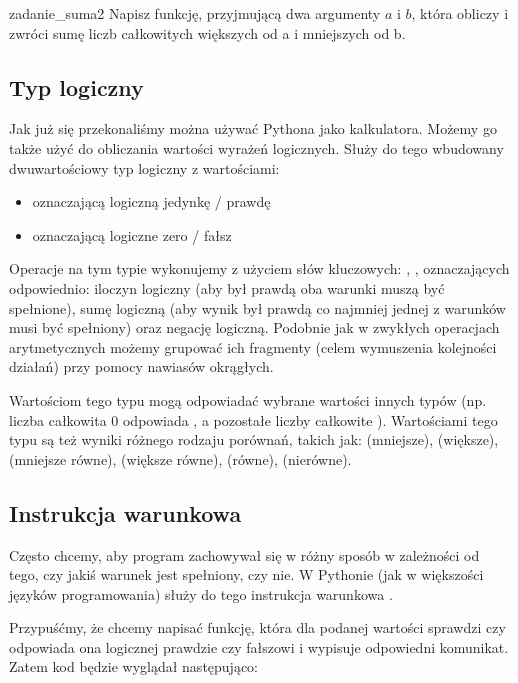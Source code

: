 \documentclass{pdfBooklets}
\begin{document}
\begin{Zadanie}{}{zadanie_suma2}
Napisz funkcję, przyjmującą dwa argumenty $a$ i $b$, która obliczy i zwróci sumę liczb całkowitych większych od a i mniejszych od b.
\end{Zadanie}

\subsection{Typ logiczny}

Jak już się przekonaliśmy można używać Pythona jako kalkulatora. Możemy go także użyć do obliczania wartości wyrażeń logicznych. Służy do tego wbudowany dwuwartościowy typ logiczny z wartościami:
\begin{itemize}
\item {} oznaczającą logiczną jedynkę / prawdę
\item {} oznaczającą logiczne zero / fałsz
\end{itemize}
Operacje na tym typie wykonujemy z użyciem słów kluczowych: , ,  oznaczających odpowiednio:
iloczyn logiczny (aby był prawdą oba warunki muszą być spełnione), sumę logiczną (aby wynik był prawdą co najmniej jednej z warunków musi być spełniony) oraz negację logiczną.
Podobnie jak w zwykłych operacjach arytmetycznych możemy grupować ich fragmenty (celem wymuszenia kolejności działań) przy pomocy nawiasów okrągłych.

Wartościom tego typu mogą odpowiadać wybrane wartości innych typów (np. liczba całkowita 0 odpowiada , a pozostałe liczby całkowite ).
Wartościami tego typu są też wyniki różnego rodzaju porównań, takich jak: \python{<} (mniejsze), \python{>} (większe), \python{<=} (mniejsze równe),
\python{>=} (większe równe), \python{==} (równe), \python{!=} (nierówne).

\subsection{Instrukcja warunkowa }

Często chcemy, aby program zachowywał się w różny sposób w zależności od tego, czy jakiś warunek jest spełniony, czy nie.
W Pythonie (jak w większości języków programowania) służy do tego instrukcja warunkowa .

Przypuśćmy, że chcemy napisać funkcję, która dla podanej wartości sprawdzi czy odpowiada ona logicznej prawdzie czy fałszowi i wypisuje odpowiedni komunikat.
Zatem kod będzie wyglądał następująco:
\end{document}
